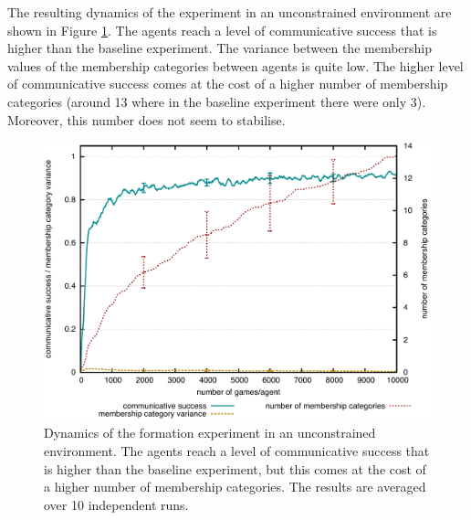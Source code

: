 The resulting dynamics of the experiment in an unconstrained
environment are shown in Figure \ref{f:gm-formation-dynamics}. The
agents reach a level of communicative success that is higher than the
baseline experiment. The variance between the membership values of the
membership categories between agents is quite low. The higher level of
communicative success comes at the cost of a higher number of
membership categories (around 13 where in the baseline experiment
there were only 3). Moreover, this number does not seem to stabilise.

\begin{figure}[htpb]
  \begin{center}
    \includegraphics[width=.8\textwidth]{./graded-membership/figures/strict-formation.pdf}
    \caption[Dynamics of the formation experiment in an unconstrained
    environment]{Dynamics of the formation experiment in an
      unconstrained environment. The agents reach a level of
      communicative success that is higher than the baseline
      experiment, but this comes at the cost of a higher number of
      membership categories. The results are averaged over 10
      independent runs.}
    \label{f:gm-formation-dynamics}
  \end{center}
\end{figure}

